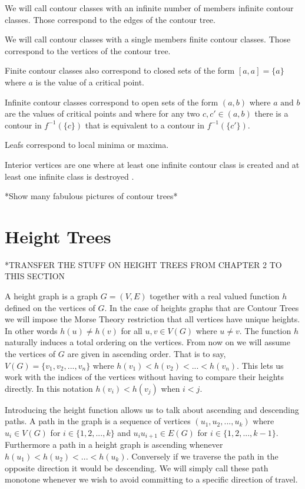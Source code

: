 \begin{defn} We will call contour classes with an infinite number of members infinite contour classes. Those correspond to the edges of the contour tree.  \end{defn}

\begin{defn} We will call contour classes with a single members finite contour classes. Those correspond to the vertices of the contour tree.  \end{defn}

Finite contour classes also correspond to closed sets of the form $[a, a] = \{a\}$ where $a$ is the value of a critical point.

Infinite contour classes correspond to open sets of the form $(a, b)$ where $a \text{ and } b$ are the values of critical points and where for any two $c, c' \in (a, b)$ there is a contour in $f^{-1}(\{c\})$ that is equivalent to a contour in $f^{-1}(\{c'\})$.

Leafs correspond to local minima or maxima.

Interior vertices are one where at least one infinite contour class is created and at least one infinite class is destroyed \cite{hamish-masters}.

*Show many fabulous pictures of contour trees*

\section{Height Trees}

*TRANSFER THE STUFF ON HEIGHT TREES FROM CHAPTER 2 TO THIS SECTION

A height graph is a graph $G = (V, E)$ together with a real valued function $h$ defined on the vertices of $G$. In the case of heights graphs that are Contour Trees we will impose the Morse Theory restriction that all vertices have unique heights. In other words $h(u) \ne h(v)$ for all $u ,v \in V(G)$ where $u \ne v$. The function $h$ naturally induces a total ordering on the vertices. From now on we will assume the vertices of $G$ are given in ascending order. That is to say, $V(G) = \{v_1, v_2, ... , v_n\}$ where $h(v_1) < h(v_2) < ... < h(v_n)$. This lets us work with the indices of the vertices without having to compare their heights directly. In this notation $h(v_i) < h(v_j)$ when $i < j$.


Introducing the height function allows us to talk about ascending and descending paths. A path in the graph is a sequence of vertices $(u_1, u_2, ... , u_k)$ where $u_i \in V(G)$ for $i \in \{1, 2, ..., k\}$ and $u_iu_{i+1} \in E(G)$ for $i \in \{1, 2, ..., k-1\}$. Furthermore a path in a height graph is ascending whenever $h(u_1) < h(u_2) < ... < h(u_k)$. Conversely if we traverse the path in the opposite direction it would be descending. We will simply call these path monotone whenever we wish to avoid committing to a specific direction of travel.

